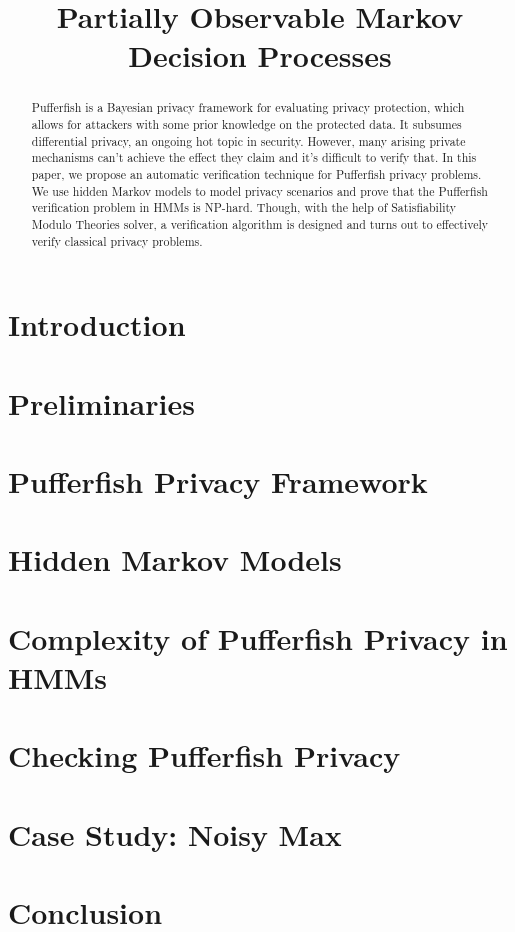 \documentclass{llncs}
\title{Partially Observable Markov Decision Processes}
\begin{document}
\maketitle

\begin{abstract}
Pufferfish is a Bayesian privacy framework for evaluating
privacy protection, which allows for attackers with some prior knowledge
on the protected data. It subsumes differential privacy, an ongoing hot
topic in security. However, many arising private mechanisms can't achieve
the effect they claim and it's difficult to verify that. In this paper, we propose an automatic verification technique
for Pufferfish privacy problems. We use hidden Markov models to model privacy scenarios
and prove that the Pufferfish verification problem in HMMs is NP-hard.
Though, with the help of Satisfiability Modulo Theories solver, a verification algorithm is designed
and turns out to effectively verify classical privacy problems.
\end{abstract}

\section{Introduction}
\label{section:introduction}


\section{Preliminaries}
\label{section:preliminaries}


\section{Pufferfish Privacy Framework}
\label{section:pufferfish}


\section{Hidden Markov Models}
\label{section:hmm}


\section{Complexity of Pufferfish Privacy in HMMs}
\label{section:complexity}


\section{Checking Pufferfish Privacy}
\label{section:checking-pufferfish}


\section{Case Study: Noisy Max}
\label{section:noisy-max}


\section{Conclusion}
\label{section:conclusion}




\end{document}
